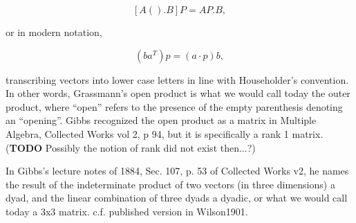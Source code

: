 \[
[A() . B] P = AP . B,
\]

or in modern notation,

\[
(b a^T) p = (a\cdot p) b,
\]

transcribing vectors into lower case letters in line with Householder's convention. In other words, Grassmann's open product is what we would call today the outer product, where ``open'' refers to the presence of the empty parenthesis denoting an ``opening''. Gibbs recognized the open product as a matrix in Multiple Algebra, Collected Works vol 2, p 94, but it is specifically a rank 1 matrix. (\textbf{TODO} Possibly the notion of rank did not exist then...?) 

In Gibbs's lecture notes of 1884, Sec. 107, p. 53 of Collected Works v2, he names the result of the indeterminate product of two vectors (in three dimensions) a dyad, and the linear combination of three dyads a dyadic, or what we would call today a 3x3 matrix. c.f. published version in Wilson1901.